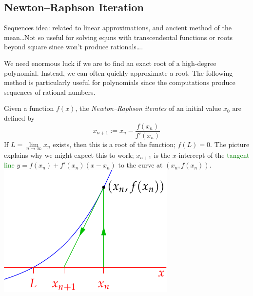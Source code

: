 \clearpage


\subsection{Newton--Raphson Iteration}

Sequences idea: related to linear approximations, and ancient method of the mean\ldots Not so useful for solving equns with transcendental functions or roots beyond square since won't produce rationals\ldots.

We need enormous luck if we are to find an exact root of a high-degree polynomial. Instead, we can often quickly approximate a root. The following method is particularly useful for polynomials since the computations produce sequences of rational numbers.

\begin{defn}[lower separated=false, sidebyside, sidebyside align=top seam, sidebyside gap=0pt, righthand width=0.35\linewidth]{}{}
Given a function $f(x)$, the \emph{Newton--Raphson iterates} of an initial value $x_0$ are defined by
\[x_{n+1}:=x_n-\frac{f(x_n)}{f'(x_n)}\]
If $L=\lim\limits_{n\to\infty}x_n$ exists, then this is a root of the function; $f(L)=0$.\smallbreak
The picture explains why we might expect this to work; $x_{n+1}$ is the $x$-intercept of the \textcolor{Green}{tangent line} $y=f(x_n)+f'(x_n)(x-x_n)$ to the curve at $(x_n,f(x_n))$.
\tcblower
\flushright\includegraphics{newton-raphson3}
\end{defn}

